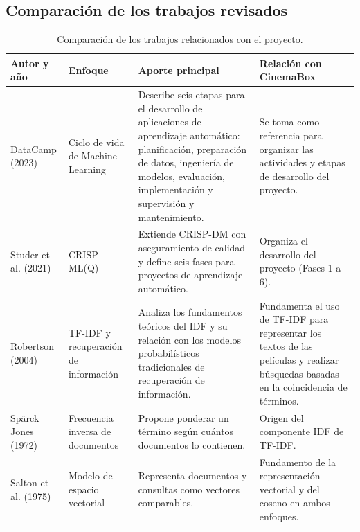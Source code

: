 \begin{landscape}
\subsection{Comparación de los trabajos revisados}
\begin{table}[H]
    \centering
    \caption{Comparación de los trabajos relacionados con el proyecto.}
    \label{tab:comparacion_estado_arte}
    \small
    \begin{tabularx}{\columnwidth}{|p{2.6cm}|p{2.8cm}|X|X|}
        \hline
        \textbf{Autor y año} & \textbf{Enfoque} &
        \textbf{Aporte principal} & \textbf{Relación con CinemaBox} \\
        \hline

        DataCamp (2023) \cite{datacamp_ml_lifecycle} &
        Ciclo de vida de Machine Learning &
        Describe seis etapas para el desarrollo de aplicaciones de aprendizaje automático: planificación, preparación de datos, ingeniería de modelos, evaluación, implementación y supervisión y mantenimiento. &
        Se toma como referencia para organizar las actividades y etapas de desarrollo del proyecto. \\
        \hline

        Studer et al. (2021) \cite{studer2021crispml} &
        CRISP-ML(Q) &
        Extiende CRISP-DM con aseguramiento de calidad y define seis fases para proyectos de aprendizaje automático. &
        Organiza el desarrollo del proyecto (Fases 1 a 6). \\
        \hline

        Robertson (2004) \cite{robertson2004idf} &
        TF-IDF y recuperación de información &
        Analiza los fundamentos teóricos del IDF y su relación con los modelos probabilísticos tradicionales de recuperación de información. &
        Fundamenta el uso de TF-IDF para representar los textos de las películas y realizar búsquedas basadas en la coincidencia de términos. \\
        \hline

        Spärck Jones (1972) \cite{sparckjones1972idf} &
        Frecuencia inversa de documentos &
        Propone ponderar un término según cuántos documentos lo contienen. &
        Origen del componente IDF de TF-IDF. \\
        \hline

        Salton et al. (1975) \cite{salton1975vsm} &
        Modelo de espacio vectorial &
        Representa documentos y consultas como vectores comparables. &
        Fundamento de la representación vectorial y del coseno en ambos enfoques. \\
        \hline


\end{tabularx}
\end{table}
\end{landscape}

